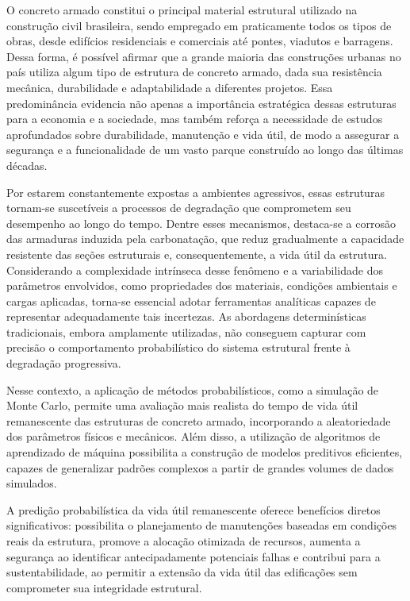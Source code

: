 O concreto armado constitui o principal material estrutural utilizado na construção civil brasileira, sendo empregado em praticamente todos os tipos de obras, desde edifícios residenciais e comerciais até pontes, viadutos e barragens. Dessa forma, é possível afirmar que a grande maioria das construções urbanas no país utiliza algum tipo de estrutura de concreto armado, dada sua resistência mecânica, durabilidade e adaptabilidade a diferentes projetos. Essa predominância evidencia não apenas a importância estratégica dessas estruturas para a economia e a sociedade, mas também reforça a necessidade de estudos aprofundados sobre durabilidade, manutenção e vida útil, de modo a assegurar a segurança e a funcionalidade de um vasto parque construído ao longo das últimas décadas.

Por estarem constantemente expostas a ambientes agressivos, essas estruturas tornam-se suscetíveis a processos de degradação que comprometem seu desempenho ao longo do tempo. Dentre esses mecanismos, destaca-se a corrosão das armaduras induzida pela carbonatação, que reduz gradualmente a capacidade resistente das seções estruturais e, consequentemente, a vida útil da estrutura. Considerando a complexidade intrínseca desse fenômeno e a variabilidade dos parâmetros envolvidos, como propriedades dos materiais, condições ambientais e cargas aplicadas, torna-se essencial adotar ferramentas analíticas capazes de representar adequadamente tais incertezas. As abordagens determinísticas tradicionais, embora amplamente utilizadas, não conseguem capturar com precisão o comportamento probabilístico do sistema estrutural frente à degradação progressiva.

Nesse contexto, a aplicação de métodos probabilísticos, como a simulação de Monte Carlo, permite uma avaliação mais realista do tempo de vida útil remanescente das estruturas de concreto armado, incorporando a aleatoriedade dos parâmetros físicos e mecânicos. Além disso, a utilização de algoritmos de aprendizado de máquina possibilita a construção de modelos preditivos eficientes, capazes de generalizar padrões complexos a partir de grandes volumes de dados simulados.

A predição probabilística da vida útil remanescente oferece benefícios diretos significativos: possibilita o planejamento de manutenções baseadas em condições reais da estrutura, promove a alocação otimizada de recursos, aumenta a segurança ao identificar antecipadamente potenciais falhas e contribui para a sustentabilidade, ao permitir a extensão da vida útil das edificações sem comprometer sua integridade estrutural.

